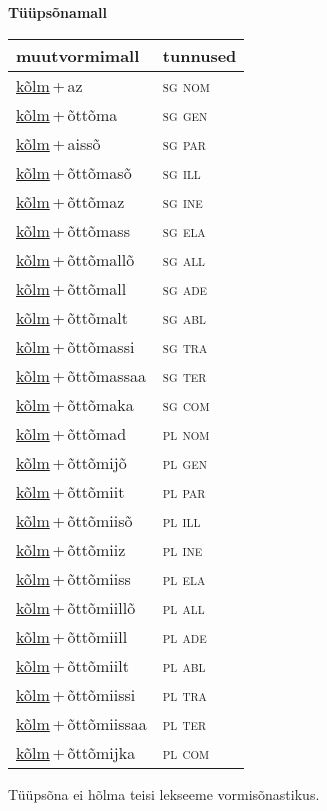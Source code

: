 
\vspace{1.8em}
\begin{minipage}{\textwidth}
\textbf{Tüüpsõnamall \,}\\

\begin{sideways}
\begin{tabular}{l l}
muutvormimall & tunnused \\
\hline
\underline{kõlm}\,+\,az & \textsc{ sg nom } \\
\underline{kõlm}\,+\,õttõma & \textsc{ sg gen } \\
\underline{kõlm}\,+\,aissõ & \textsc{ sg par } \\
\underline{kõlm}\,+\,õttõmasõ & \textsc{ sg ill } \\
\underline{kõlm}\,+\,õttõmaz & \textsc{ sg ine } \\
\underline{kõlm}\,+\,õttõmass & \textsc{ sg ela } \\
\underline{kõlm}\,+\,õttõmallõ & \textsc{ sg all } \\
\underline{kõlm}\,+\,õttõmall & \textsc{ sg ade } \\
\underline{kõlm}\,+\,õttõmalt & \textsc{ sg abl } \\
\underline{kõlm}\,+\,õttõmassi & \textsc{ sg tra } \\
\underline{kõlm}\,+\,õttõmassaa & \textsc{ sg ter } \\
\underline{kõlm}\,+\,õttõmaka & \textsc{ sg com } \\
\underline{kõlm}\,+\,õttõmad & \textsc{ pl nom } \\
\underline{kõlm}\,+\,õttõmijõ & \textsc{ pl gen } \\
\underline{kõlm}\,+\,õttõmiit & \textsc{ pl par } \\
\underline{kõlm}\,+\,õttõmiisõ & \textsc{ pl ill } \\
\underline{kõlm}\,+\,õttõmiiz & \textsc{ pl ine } \\
\underline{kõlm}\,+\,õttõmiiss & \textsc{ pl ela } \\
\underline{kõlm}\,+\,õttõmiillõ & \textsc{ pl all } \\
\underline{kõlm}\,+\,õttõmiill & \textsc{ pl ade } \\
\underline{kõlm}\,+\,õttõmiilt & \textsc{ pl abl } \\
\underline{kõlm}\,+\,õttõmiissi & \textsc{ pl tra } \\
\underline{kõlm}\,+\,õttõmiissaa & \textsc{ pl ter } \\
\underline{kõlm}\,+\,õttõmijka & \textsc{ pl com } \\
\end{tabular}
\end{sideways}
\label{tab:tüüpsõnamall-kõlmaz}

\end{minipage}

 
\vspace{1em}
\noindent Tüüpsõna ei hõlma teisi lekseeme vormi\-sõnastikus.

